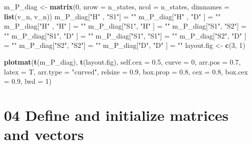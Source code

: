 \documentclass[
]{article}
\newenvironment{Shaded}{\begin{snugshade}}{\end{snugshade}}
\newcommand{\DataTypeTok}[1]{\textcolor[rgb]{0.13,0.29,0.53}{#1}}
\newcommand{\DecValTok}[1]{\textcolor[rgb]{0.00,0.00,0.81}{#1}}
\newcommand{\FloatTok}[1]{\textcolor[rgb]{0.00,0.00,0.81}{#1}}
\newcommand{\KeywordTok}[1]{\textcolor[rgb]{0.13,0.29,0.53}{\textbf{#1}}}
\newcommand{\NormalTok}[1]{#1}
\newcommand{\StringTok}[1]{\textcolor[rgb]{0.31,0.60,0.02}{#1}}
\begin{document}
\begin{Shaded}
\begin{Highlighting}[]
\NormalTok{m_P_diag <-}\StringTok{ }\KeywordTok{matrix}\NormalTok{(}\DecValTok{0}\NormalTok{, }\DataTypeTok{nrow =}\NormalTok{ n_states, }\DataTypeTok{ncol =}\NormalTok{ n_states, }\DataTypeTok{dimnames =} \KeywordTok{list}\NormalTok{(v_n, v_n))}
\NormalTok{m_P_diag[}\StringTok{"H"}\NormalTok{ , }\StringTok{"S1"}\NormalTok{] =}\StringTok{ ""} 
\NormalTok{m_P_diag[}\StringTok{"H"}\NormalTok{ , }\StringTok{"D"}\NormalTok{ ] =}\StringTok{ ""} 
\NormalTok{m_P_diag[}\StringTok{"H"}\NormalTok{ , }\StringTok{"H"}\NormalTok{ ] =}\StringTok{ ""} 
\NormalTok{m_P_diag[}\StringTok{"S1"}\NormalTok{, }\StringTok{"H"}\NormalTok{ ] =}\StringTok{ ""} 
\NormalTok{m_P_diag[}\StringTok{"S1"}\NormalTok{, }\StringTok{"S2"}\NormalTok{] =}\StringTok{ ""} 
\NormalTok{m_P_diag[}\StringTok{"S1"}\NormalTok{, }\StringTok{"D"}\NormalTok{ ] =}\StringTok{ ""} 
\NormalTok{m_P_diag[}\StringTok{"S1"}\NormalTok{, }\StringTok{"S1"}\NormalTok{] =}\StringTok{ ""} 
\NormalTok{m_P_diag[}\StringTok{"S2"}\NormalTok{, }\StringTok{"D"}\NormalTok{ ] =}\StringTok{ ""} 
\NormalTok{m_P_diag[}\StringTok{"S2"}\NormalTok{, }\StringTok{"S2"}\NormalTok{] =}\StringTok{ ""} 
\NormalTok{m_P_diag[}\StringTok{"D"}\NormalTok{, }\StringTok{"D"}\NormalTok{  ] =}\StringTok{ ""} 
\NormalTok{layout.fig <-}\StringTok{ }\KeywordTok{c}\NormalTok{(}\DecValTok{3}\NormalTok{, }\DecValTok{1}\NormalTok{)}

\KeywordTok{plotmat}\NormalTok{(}\KeywordTok{t}\NormalTok{(m_P_diag), }\KeywordTok{t}\NormalTok{(layout.fig), }\DataTypeTok{self.cex =} \FloatTok{0.5}\NormalTok{, }\DataTypeTok{curve =} \DecValTok{0}\NormalTok{, }\DataTypeTok{arr.pos =} \FloatTok{0.7}\NormalTok{,  }
        \DataTypeTok{latex =}\NormalTok{ T, }\DataTypeTok{arr.type =} \StringTok{"curved"}\NormalTok{, }\DataTypeTok{relsize =} \FloatTok{0.9}\NormalTok{, }\DataTypeTok{box.prop =} \FloatTok{0.8}\NormalTok{, }
        \DataTypeTok{cex =} \FloatTok{0.8}\NormalTok{, }\DataTypeTok{box.cex =} \FloatTok{0.9}\NormalTok{, }\DataTypeTok{lwd =} \DecValTok{1}\NormalTok{)}
\end{Highlighting}
\end{Shaded}

\hypertarget{define-and-initialize-matrices-and-vectors}{%
\section{04 Define and initialize matrices and
vectors}\label{define-and-initialize-matrices-and-vectors}}
\end{document}
